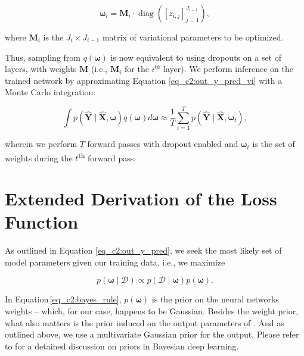 \begin{equation}
\boldsymbol{\omega}_{i} =\boldsymbol{M}_{i} \cdot \operatorname{diag}\left(\left[z_{i, j}\right]_{j=1}^{J_{i-1}}\right) ,
\label{eq_c2:bernoulli}
\end{equation}

\noindent
where $\boldsymbol{M}_i$ is the $J_i \times J_{i-1}$ matrix of variational parameters to be optimized. 

Thus, sampling from $q(\boldsymbol{\omega})$ is now equivalent to using dropouts on a set of layers, with weights $\boldsymbol{M}$ %
(i.e., $\boldsymbol{M}_i$ for the $i^{th}$ layer). 
We perform inference on the trained network by 
approximating Equation \ref{eq_c2:out_y_pred_vi} with a Monte Carlo integration: 

\begin{equation}
\int p(\boldsymbol{\hat{Y}} \mid \boldsymbol{\hat{X}}, \boldsymbol{\omega}) q(\boldsymbol{\omega}) d \boldsymbol{\omega} \approx \frac{1}{T} \sum_{t=1}^{T} p(\boldsymbol{\hat{Y}} \mid \boldsymbol{\hat{X}}, \boldsymbol{\omega}_t) ,
\end{equation}

\noindent
wherein we perform $T$ forward passes with dropout enabled and $\boldsymbol{\omega}_t$ is the set of weights during the $t$\textsuperscript{th} forward pass.

\section{Extended Derivation of the Loss Function} \label{sec_c2:ap:final_loss_deri}


As outlined in Equation \ref{eq_c2:out_y_pred}, we seek the most likely set of model parameters given our training data, %
i.e., we maximize 

\begin{equation}
p(\boldsymbol{\omega} \mid \mathcal{D}) \propto p(\mathcal{D} \mid \boldsymbol{\omega})p(\boldsymbol{\omega}) .
\label{eq_c2:bayes_rule}
\end{equation}

In Equation\,\ref{eq_c2:bayes_rule}, $p(\boldsymbol{\omega})$ is the prior on the neural networks weights -- which, for our case, happens to be Gaussian. Besides the weight prior, what also matters is the prior induced on the output parameters of \gampen{}. And as outlined above, we use a multivariate Gaussian prior for the output. Please refer to \cite{wilson_20} for a detained discussion on priors in Bayesian deep learning. 

